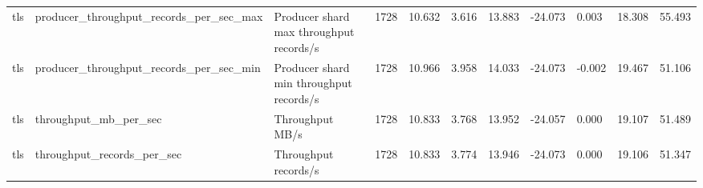 \begin{longtable}{lllllllllll}
tls & producer\_throughput\_records\_per\_sec\_max & Producer shard max throughput records/s & 1728 & 10.632 & 3.616 & 13.883 & -24.073 & 0.003 & 18.308 & 55.493 \\
tls & producer\_throughput\_records\_per\_sec\_min & Producer shard min throughput records/s & 1728 & 10.966 & 3.958 & 14.033 & -24.073 & -0.002 & 19.467 & 51.106 \\
tls & throughput\_mb\_per\_sec & Throughput MB/s & 1728 & 10.833 & 3.768 & 13.952 & -24.057 & 0.000 & 19.107 & 51.489 \\
tls & throughput\_records\_per\_sec & Throughput records/s & 1728 & 10.833 & 3.774 & 13.946 & -24.073 & 0.000 & 19.106 & 51.347 \\
\hline
\end{longtable}
